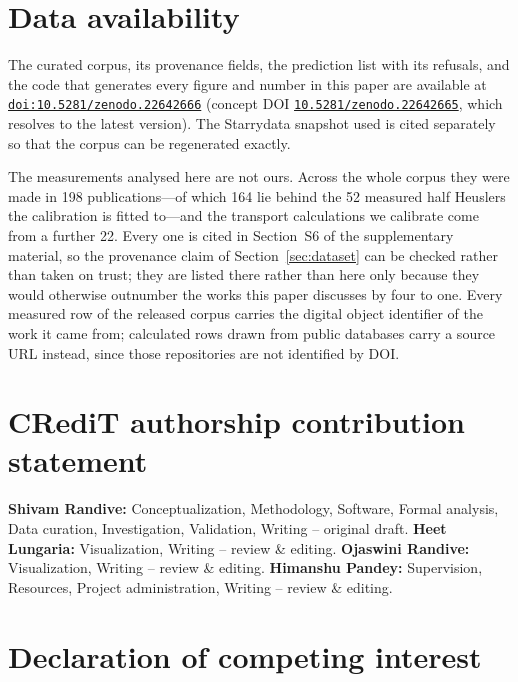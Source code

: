 \documentclass[final,5p,times,twocolumn]{elsarticle}
\newcommand{\heetroles}{Visualization, Writing -- review \& editing.}
\newcommand{\repourl}{\href{https://doi.org/10.5281/zenodo.22642666}%
  {\texttt{doi:10.5281/zenodo.22642666}} (concept DOI
  \href{https://doi.org/10.5281/zenodo.22642665}{\texttt{10.5281/zenodo.22642665}}, which resolves
  to the latest version)}
\begin{document}
\section*{Data availability}
\label{sec:data-availability}

The curated corpus, its provenance fields, the prediction list with its refusals, and the code that
generates every figure and number in this paper are available at \repourl. The Starrydata snapshot
used is cited separately so that the corpus can be regenerated exactly.

The measurements analysed here are not ours. Across the whole corpus they were made in \num{198}
publications---of which \num{164} lie behind the \num{52} measured half Heuslers the calibration is
fitted to---and the transport calculations we calibrate come from a further \num{22}. Every one is
cited in Section~S6 of the supplementary material, so the provenance claim of
Section~\ref{sec:dataset} can be checked rather than taken on trust; they are listed there rather
than here only because they would otherwise outnumber the works this paper discusses by four to
one. Every measured row of the released corpus carries the digital object identifier of the work it
came from; calculated rows drawn from public databases carry a source URL instead, since those
repositories are not identified by DOI.

\section*{CRediT authorship contribution statement}

\textbf{Shivam Randive:} Conceptualization, Methodology, Software, Formal analysis,
Data curation, Investigation, Validation, Writing -- original draft.
\textbf{Heet Lungaria:} \heetroles
\textbf{Ojaswini Randive:} Visualization, Writing -- review \& editing.
\textbf{Himanshu Pandey:} Supervision, Resources, Project administration,
Writing -- review \& editing.

\section*{Declaration of competing interest}
\end{document}
